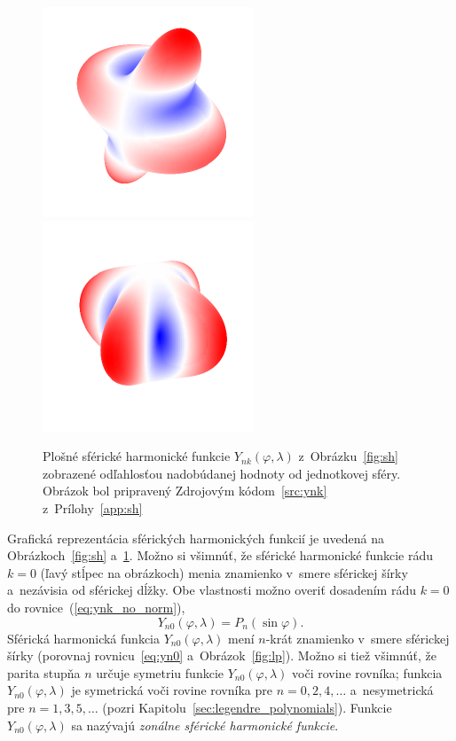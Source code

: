 \documentclass[a4paper, 12pt]{book}
\begin{document}
\begin{figure}[bt]
\includegraphics{./fig-spherical-harmonic-n4-k1-3d.pdf}
\includegraphics{./fig-spherical-harmonic-n4-k4-3d.pdf}
\caption{Plošné sférické harmonické funkcie $Y_{nk}(\varphi, \lambda)$ 
z~Obrázku~\ref{fig:sh} zobrazené odľahlosťou nadobúdanej hodnoty od jednotkovej 
sféry.  Obrázok bol pripravený Zdrojovým kódom~\ref{src:ynk} 
z~Prílohy~\ref{app:sh}}
\label{fig:sh3d}
\end{figure}

Grafická reprezentácia sférických harmonických funkcií je uvedená na 
Obrázkoch~\ref{fig:sh} a~\ref{fig:sh3d}.  Možno si všimnúť, že sférické 
harmonické funkcie rádu $k = 0$ (ľavý stĺpec na obrázkoch) menia znamienko 
v~smere sférickej šírky a~nezávisia od sférickej dĺžky.  Obe vlastnosti možno 
overiť dosadením rádu $k = 0$ do rovnice~(\ref{eq:ynk_no_norm}),
%
\begin{equation}
\label{eq:yn0}
Y_{n0}(\varphi, \lambda) = P_n(\sin\varphi){.}
\end{equation}
%
Sférická harmonická funkcia $Y_{n0}(\varphi, \lambda)$ mení $n$-krát znamienko 
v~smere sférickej šírky (porovnaj rovnicu~\ref{eq:yn0} a~Obrázok~\ref{fig:lp}).  
Možno si tiež všimnúť, že parita stupňa $n$ určuje symetriu funkcie 
$Y_{n0}(\varphi, \lambda)$ voči rovine rovníka; funkcia $Y_{n0}(\varphi, 
\lambda)$ je symetrická voči rovine rovníka pre $n = 0, 2, 4, \dots$ 
a~nesymetrická pre $n = 1, 3, 5, \dots$ (pozri 
Kapitolu~\ref{sec:legendre_polynomials}). Funkcie $Y_{n0}(\varphi, \lambda)$ sa 
nazývajú \emph{zonálne sférické harmonické funkcie}.
\end{document}

